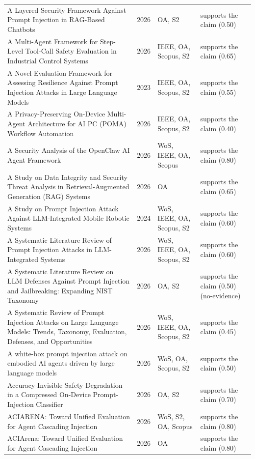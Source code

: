 \begin{longtable}{@{}%
  >{\raggedright\arraybackslash}p{}c%
  >{\raggedright\arraybackslash}p{}%
  >{\raggedright\arraybackslash}p{}@{}}
A Layered Security Framework Against Prompt Injection in RAG-Based Chatbots & 2026 & OA, S2 & supports the claim (0.50) \\
A Multi-Agent Framework for Step-Level Tool-Call Safety Evaluation in Industrial Control Systems & 2026 & IEEE, OA, Scopus, S2 & supports the claim (0.65) \\
A Novel Evaluation Framework for Assessing Resilience Against Prompt Injection Attacks in Large Language Models & 2023 & IEEE, OA, Scopus, S2 & supports the claim (0.55) \\
A Privacy-Preserving On-Device Multi-Agent Architecture for AI PC (POMA) Workflow Automation & 2026 & IEEE, OA, Scopus, S2 & supports the claim (0.40) \\
A Security Analysis of the OpenClaw AI Agent Framework & 2026 & WoS, IEEE, OA, Scopus & supports the claim (0.80) \\
A Study on Data Integrity and Security Threat Analysis in Retrieval-Augmented Generation (RAG) Systems & 2026 & OA & supports the claim (0.65) \\
A Study on Prompt Injection Attack Against LLM-Integrated Mobile Robotic Systems & 2024 & WoS, IEEE, OA, Scopus, S2 & supports the claim (0.60) \\
A Systematic Literature Review of Prompt Injection Attacks in LLM-Integrated Systems & 2026 & WoS, IEEE, OA, Scopus, S2 & supports the claim (0.60) \\
A Systematic Literature Review on LLM Defenses Against Prompt Injection and Jailbreaking: Expanding NIST Taxonomy & 2026 & OA, S2 & supports the claim (0.50) (no-evidence) \\
A Systematic Review of Prompt Injection Attacks on Large Language Models: Trends, Taxonomy, Evaluation, Defenses, and Opportunities & 2026 & WoS, IEEE, OA, Scopus, S2 & supports the claim (0.45) \\
A white-box prompt injection attack on embodied AI agents driven by large language models & 2026 & WoS, OA, Scopus, S2 & supports the claim (0.50) \\
Accuracy-Invisible Safety Degradation in a Compressed On-Device Prompt-Injection Classifier & 2026 & OA, S2 & supports the claim (0.70) \\
ACIARENA: Toward Unified Evaluation for Agent Cascading Injection & 2026 & WoS, S2, OA, Scopus & supports the claim (0.80) \\
ACIArena: Toward Unified Evaluation for Agent Cascading Injection & 2026 & OA & supports the claim (0.80) \\

\end{longtable}
